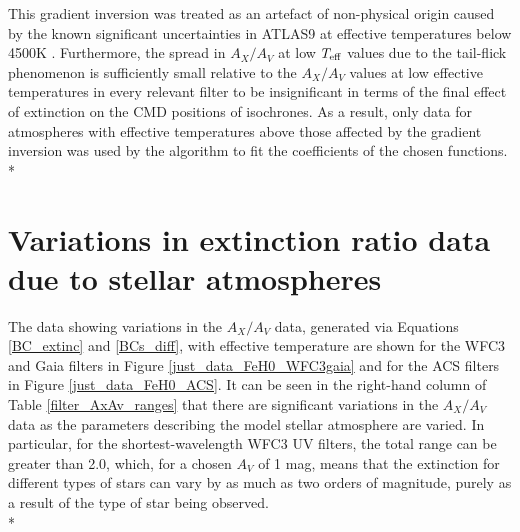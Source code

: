 \documentclass[12pt, a4paper]{report}
\begin{document}
This gradient inversion was treated as an artefact of non-physical origin caused by the known significant uncertainties in ATLAS9 at effective temperatures below 4500K \citep{2004astro.ph..5087C,2008PASP..120..583G}. Furthermore, the spread in $A_{X}/A_{V}$ at low $T_{\textnormal{eff}}$ values due to the tail-flick phenomenon is sufficiently small relative to the $A_{X}/A_{V}$ values at low effective temperatures in every relevant filter to be insignificant in terms of the final effect of extinction on the CMD positions of isochrones. As a result, only data for atmospheres with effective temperatures above those affected by the gradient inversion was used by the algorithm to fit the coefficients of the chosen functions.\\*


\section{Variations in extinction ratio data due to stellar atmospheres} \label{desc_var}

The data showing variations in the $A_{X}/A_{V}$ data, generated via Equations \ref{BC_extinc} and \ref{BCs_diff}, with effective temperature are shown for the WFC3 and Gaia filters in Figure \ref{just_data_FeH0_WFC3gaia} and for the ACS filters in Figure \ref{just_data_FeH0_ACS}. It can be seen in the right-hand column of Table \ref{filter_AxAv_ranges} that there are significant variations in the $A_{X}/A_{V}$ data as the parameters describing the model stellar atmosphere are varied. In particular, for the shortest-wavelength WFC3 UV filters, the total range can be greater than 2.0, which, for a chosen $A_{V}$ of 1 mag, means that the extinction for different types of stars can vary by as much as two orders of magnitude, purely as a result of the type of star being observed.\\*
\end{document}
